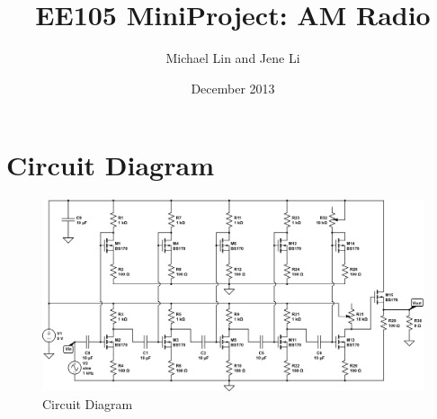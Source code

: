 \documentclass[11pt, twoside, letterpaper]{article}
\title{EE105 MiniProject: AM Radio}
\author{Michael Lin and Jene Li}
\date{December 2013}
\begin{document}
\maketitle

\section{Circuit Diagram}
\begin{figure}[htbp]
	\begin{center}
		\includegraphics[scale=0.75,angle=-90]{circuitdiagram.png}
		\caption{Circuit Diagram}
	\end{center}
\end{figure}
\FloatBarrier
\newpage
\end{document}
